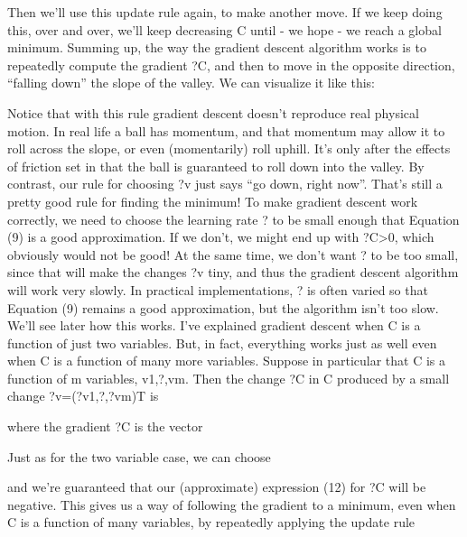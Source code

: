 Then we'll use this update rule again, to make another move. If we keep doing this, over and over, we'll keep decreasing C until - we hope - we reach a global minimum.
Summing up, the way the gradient descent algorithm works is to repeatedly compute the gradient ?C, and then to move in the opposite direction, ``falling down'' the slope of the valley. We can visualize it like this:

Notice that with this rule gradient descent doesn't reproduce real physical motion. In real life a ball has momentum, and that momentum may allow it to roll across the slope, or even (momentarily) roll uphill. It's only after the effects of friction set in that the ball is guaranteed to roll down into the valley. By contrast, our rule for choosing ?v just says ``go down, right now''. That's still a pretty good rule for finding the minimum!
To make gradient descent work correctly, we need to choose the learning rate ? to be small enough that Equation (9) is a good approximation. If we don't, we might end up with ?C>0, which obviously would not be good! At the same time, we don't want ? to be too small, since that will make the changes ?v tiny, and thus the gradient descent algorithm will work very slowly. In practical implementations, ? is often varied so that Equation (9) remains a good approximation, but the algorithm isn't too slow. We'll see later how this works. 
I've explained gradient descent when C is a function of just two variables. But, in fact, everything works just as well even when C is a function of many more variables. Suppose in particular that C is a function of m variables, v1,?,vm. Then the change ?C in C produced by a small change ?v=(?v1,?,?vm)T is 

where the gradient ?C is the vector 

Just as for the two variable case, we can choose 

and we're guaranteed that our (approximate) expression (12) for ?C will be negative. This gives us a way of following the gradient to a minimum, even when C is a function of many variables, by repeatedly applying the update rule 

